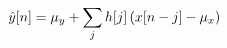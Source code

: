 \documentclass[preview]{standalone}
\begin{document}
\begin{align*}
\special{dvisvgm:raw <g id='unique000'>}\hat{y}[n]=\mu_y+\sum_j h[j]\,(x[n-j]-\mu_x)\special{dvisvgm:raw </g>}
\end{align*}
\end{document}
